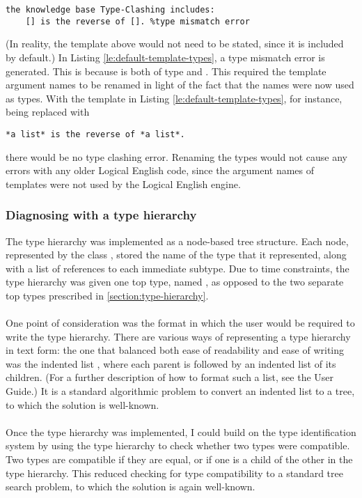 \documentclass[../main.tex]{subfiles}
\begin{document}
{\begin{lstlisting}[language={LE},caption={A Logical English program using a default template in which the types are inconsistent.},label={le:default-template-types}]
    the knowledge base Type-Clashing includes:
    [] is the reverse of []. %type mismatch error
\end{lstlisting}
(In reality, the template above would not need to be stated, since it is included by default.) In Listing \ref{le:default-template-types}, a type mismatch error is generated. This is because \codeword{[]} is both of type  and .
This required the template argument names to be renamed in light of the fact that the names were now used as types. With the template in Listing \ref{le:default-template-types}, for instance, being replaced with 
\begin{lstlisting}[language={LE}]
    *a list* is the reverse of *a list*.
\end{lstlisting}
there would be no type clashing error. Renaming the types would not cause any errors with any older Logical English code, since the argument names of templates were not used by the Logical English engine.

\subsubsection{Diagnosing with a type hierarchy}
The type hierarchy was implemented as a node-based tree structure. Each node, represented by the class , stored the name of the type that it represented, along with a list of references to each immediate subtype. Due to time constraints, the type hierarchy was given one top type, named , as opposed to the two separate top types prescribed in \ref{section:type-hierarchy}.
\\
\\
One point of consideration was the format in which the user would be required to write the type hierarchy. There are various ways of representing a type hierarchy in text form: the one that balanced both ease of readability and ease of writing was the indented list \cite{indented_list_to_tree}, where each parent is followed by an indented list of its children. (For a further description of how to format such a list, see the User Guide.) It is a standard algorithmic problem to convert an indented list to a tree, to which the solution is well-known. 
\\
\\
Once the type hierarchy was implemented, I could build on the type identification system by using the type hierarchy to check whether two types were compatible. Two types are compatible if they are equal, or if one is a child of the other in the type hierarchy. This reduced checking for type compatibility to a standard tree search problem, to which the solution is again well-known.
%
%
%
}
\end{document}
